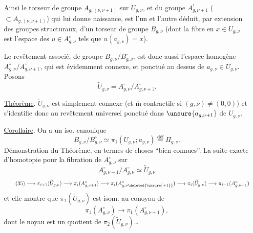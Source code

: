 Ainsi le torseur  de groupe $A_{g,(\nu,\nu+1)}$  sur  $U_{g,\nu}$, et  du groupe $A_{g,\nu+1}^{!}$ ($\subset A_{g,(\nu,\nu+1)}$) qui lui donne naissance, est l'un et l'autre déduit, par extension des groupes structuraux, d'un torseur de groupe $B_{g,\nu}$ (dont la fibre en $x\in U_{g,\nu}$ est l'espace des  $u\in A_{g,\nu}^{\circ}$ tels que $u(a_{g,\nu})=x$).

Le revêtement  associé, de groupe $B_{g,\nu}/B_{g,\nu}^{\circ}$, est donc aussi l'espace homogène $A_{g,\nu}^{\circ}/A_{g,\nu+1}^{\circ}$, qui est évidemment connexe, et ponctué au dessus de $a_{g,\nu}\in U_{g,\nu}$. Posons
\[
\tag{33}
\widetilde U_{g,\nu}=A_{g,\nu}^{\circ}/A_{g,\nu+1}^{\circ}.
\]

\uline{Théorème}. $\widetilde U_{g,\nu}$ est simplement connexe  (et $\overline{\mathrm m}$ contractile si $(g,\nu)\ne(0,0)$) et s'identifie donc au revêtement universel ponctué dans $\unsure{a_{g,\nu+1}}$ de $U_{g,\nu}$.


\uline{Corollaire}. On a un iso. canonique
\[
\tag{34}
B_{g,\nu}/B_{g,\nu}^{\circ}\simeq\pi_1(U_{g,\nu};a_{g,\nu})\overset{\text{déf}}{=}\Pi_{g,\nu}.
\]
Démonstration du Théorème, en termes de choses ``bien connues''. La  suite exacte d'homotopie pour la fibration de $A_{g,\nu}^{\circ}$ sur
\[
A_{g,\nu+1}^{\circ}/A_{g,\nu}^{\circ}\simeq\widetilde U_{g,\nu}
\]
\[
\tag{35}
\longrightarrow\pi_{i+1}(\widetilde U_{g,\nu})
\longrightarrow\pi_i(A_{g,\nu+1}^{\circ})
\longrightarrow\pi_i(A_{g,\nu\deleted{\unsure{+1}}}^{\circ})
\longrightarrow\pi_i(\widetilde U_{g,\nu})
\longrightarrow\pi_{i-1}(A_{g,\nu+1}^{\circ})
\]
et elle montre que $\pi_1(\widetilde U_{g,\nu})$ est isom. au conoyau de
\[
\pi_1(A_{g,\nu}^{\circ})\longrightarrow\pi_1(A_{g,\nu+1}^{\circ}),
\]
dont le noyau est un quotient de $\pi_2(\widetilde U_{g,\nu})$\ldots

